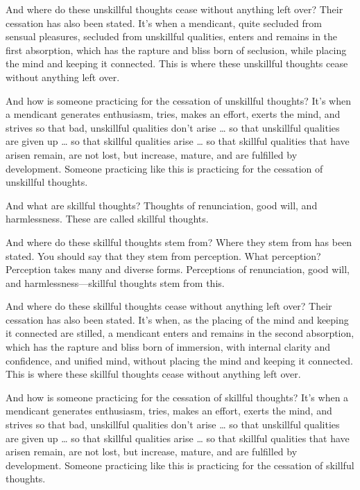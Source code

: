 \documentclass[12pt,openany]{book}%
\begin{document}
And where do these unskillful thoughts cease without anything left over? Their cessation has also been stated. It’s when a mendicant, quite secluded from sensual pleasures, secluded from unskillful qualities, enters and remains in the first absorption, which has the rapture and bliss born of seclusion, while placing the mind and keeping it connected. This is where these unskillful thoughts cease without anything left over. 

And how is someone practicing for the cessation of unskillful thoughts? It’s when a mendicant generates enthusiasm, tries, makes an effort, exerts the mind, and strives so that bad, unskillful qualities don’t arise … so that unskillful qualities are given up … so that skillful qualities arise … so that skillful qualities that have arisen remain, are not lost, but increase, mature, and are fulfilled by development. Someone practicing like this is practicing for the cessation of unskillful thoughts. 

And what are skillful thoughts? Thoughts of renunciation, good will, and harmlessness. These are called skillful thoughts. 

And where do these skillful thoughts stem from? Where they stem from has been stated. You should say that they stem from perception. What perception? Perception takes many and diverse forms. Perceptions of renunciation, good will, and harmlessness—skillful thoughts stem from this. 

And where do these skillful thoughts cease without anything left over? Their cessation has also been stated. It’s when, as the placing of the mind and keeping it connected are stilled, a mendicant enters and remains in the second absorption, which has the rapture and bliss born of immersion, with internal clarity and confidence, and unified mind, without placing the mind and keeping it connected. This is where these skillful thoughts cease without anything left over. 

And how is someone practicing for the cessation of skillful thoughts? It’s when a mendicant generates enthusiasm, tries, makes an effort, exerts the mind, and strives so that bad, unskillful qualities don’t arise … so that unskillful qualities are given up … so that skillful qualities arise … so that skillful qualities that have arisen remain, are not lost, but increase, mature, and are fulfilled by development. Someone practicing like this is practicing for the cessation of skillful thoughts. 
\end{document}

